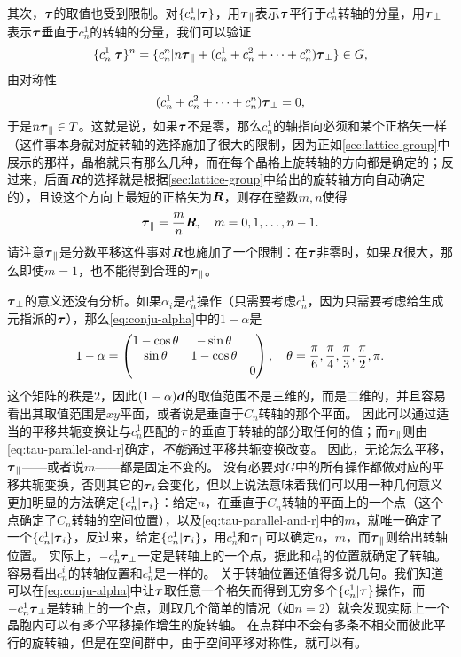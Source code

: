 其次，$\vb*{\tau}$的取值也受到限制。对$\{c_n^1 | \vb*{\tau}\}$，用$\vb*{\tau}_\parallel$表示$\vb*{\tau}$平行于$c_n^1$转轴的分量，用$\vb*{\tau}_\bot$表示$\vb*{\tau}$垂直于$c_n^1$的转轴的分量，我们可以验证
\[
    \{c_n^1 | \vb*{\tau}\}^n = \{ c_n^n | n \vb*{\tau}_\parallel + (c_n^1 + c_n^2 + \cdots + c_n^n) \vb*{\tau}_\bot \} \in G,
\]
由对称性
\[
    (c_n^1 + c_n^2 + \cdots + c_n^n) \vb*{\tau}_\bot = 0,
\]
于是$n \vb*{\tau}_\parallel \in T$。这就是说，如果$\vb*{\tau}$不是零，那么$c_n^1$的轴指向必须和某个正格矢一样（这件事本身就对旋转轴的选择施加了很大的限制，因为正如\autoref{sec:lattice-group}中展示的那样，晶格就只有那么几种，而在每个晶格上旋转轴的方向都是确定的；反过来，后面$\vb*{R}$的选择就是根据\autoref{sec:lattice-group}中给出的旋转轴方向自动确定的），且设这个方向上最短的正格矢为$\vb*{R}$，则存在整数$m, n$使得
\begin{equation}
    \vb*{\tau}_\parallel = \frac{m}{n} \vb*{R}, \quad m = 0, 1, \ldots, n-1.
    \label{eq:tau-parallel-and-r}
\end{equation}
请注意$\vb*{\tau}_\parallel$是分数平移这件事对$\vb*{R}$也施加了一个限制：在$\vb*{\tau}$非零时，如果$\vb*{R}$很大，那么即使$m=1$，也不能得到合理的$\vb*{\tau}_\parallel$。

$\vb*{\tau}_\bot$的意义还没有分析。如果$\alpha_i$是$c_n^1$操作（只需要考虑$c_n^1$，因为只需要考虑给生成元指派的$\vb*{\tau}$），那么\eqref{eq:conju-alpha}中的$1 - \alpha$是
\begin{equation}
    1 - \alpha = \pmqty{\dmat{1 - \cos \theta & - \sin \theta \\ \sin \theta & 1 - \cos \theta, 0}}, \quad \theta = \frac{\pi}{6}, \frac{\pi}{4}, \frac{\pi}{3}, \frac{\pi}{2}, \pi.
\end{equation}
这个矩阵的秩是$2$，因此$(1 - \alpha) \vb*{d}$的取值范围不是三维的，而是二维的，并且容易看出其取值范围是$xy$平面，或者说是垂直于$C_n$转轴的那个平面。
因此可以通过适当的平移共轭变换让与$c_n^1$匹配的$\vb*{\tau}$的垂直于转轴的部分取任何的值；而$\vb*{\tau}_\parallel$则由\eqref{eq:tau-parallel-and-r}确定，\emph{不能}通过平移共轭变换改变。
因此，无论怎么平移，$\vb*{\tau}_\parallel$——或者说$m$——都是固定不变的。
没有必要对$G$中的所有操作都做对应的平移共轭变换，否则其它的$\vb*{\tau}_i$会变化，但以上说法意味着我们可以用一种几何意义更加明显的方法确定$\{c_n^1 | \vb*{\tau}_i\}$：给定$n$，在垂直于$C_n$转轴的平面上的一个点（这个点确定了$C_n$转轴的空间位置），以及\eqref{eq:tau-parallel-and-r}中的$m$，就唯一确定了一个$\{c_n^1 | \vb*{\tau}_i\}$，反过来，给定$\{c_n^1 | \vb*{\tau}_i\}$，用$c_n^1$和$\vb*{\tau}_\parallel$可以确定$n$，$m$，而$\vb*{\tau}_\parallel$则给出转轴位置。
实际上，$- c_n^1 \vb*{\tau}_\bot$一定是转轴上的一个点，据此和$c_n^1$的位置就确定了转轴。
容易看出$c_n^i$的转轴位置和$c_n^1$是一样的。
关于转轴位置还值得多说几句。我们知道可以在\eqref{eq:conju-alpha}中让$\vb*{\tau}$取任意一个格矢而得到无穷多个$\{c_n^1 | \vb*{\tau}\}$操作，而$- c_n^1 \vb*{\tau}_\bot$是转轴上的一个点，则取几个简单的情况（如$n=2$）就会发现实际上一个晶胞内可以有\emph{多个}平移操作增生的旋转轴。
在点群中不会有多条不相交而彼此平行的旋转轴，但是在空间群中，由于空间平移对称性，就可以有。

